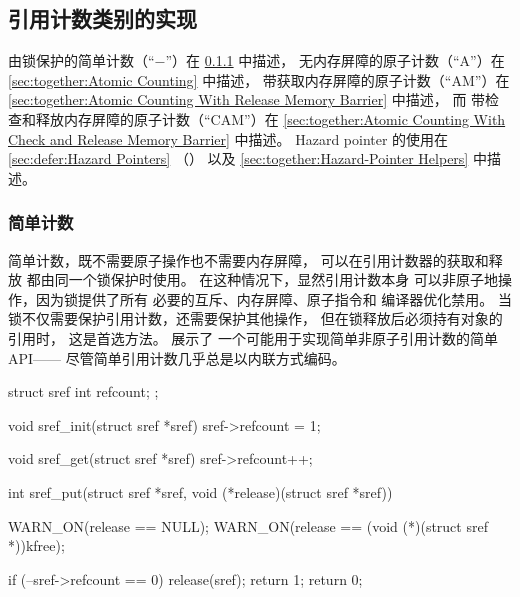 \subsection{引用计数类别的实现}
\label{sec:together:Implementation of Reference-Counting Categories}

由锁保护的简单计数（``$-$''）在
\cref{sec:together:Simple Counting} 中描述，
无内存屏障的原子计数（``A''）在
\cref{sec:together:Atomic Counting} 中描述，
带获取内存屏障的原子计数（``AM''）在
\cref{sec:together:Atomic Counting With Release Memory Barrier} 中描述，
而
带检查和释放内存屏障的原子计数（``CAM''）在
\cref{sec:together:Atomic Counting With Check and Release Memory Barrier} 中描述。
Hazard pointer 的使用在
\cref{sec:defer:Hazard Pointers}
（）
以及
\cref{sec:together:Hazard-Pointer Helpers} 中描述。

\subsubsection{简单计数}
\label{sec:together:Simple Counting}

简单计数，既不需要原子操作也不需要内存屏障，
可以在引用计数器的获取和释放
都由同一个锁保护时使用。
在这种情况下，显然引用计数本身
可以非原子地操作，因为锁提供了所有
必要的互斥、内存屏障、原子指令和
编译器优化禁用。
当锁不仅需要保护引用计数，还需要保护其他操作，
但在锁释放后必须持有对象的引用时，
这是首选方法。
 展示了
一个可能用于实现简单非原子引用计数的简单 API——
尽管简单引用计数几乎总是以内联方式编码。

\begin{listing}
\begin{fcvlabel}
\begin{VerbatimL}[commandchars=\\\[\]]
struct sref {
	int refcount;
};

void sref_init(struct sref *sref)
{
	sref->refcount = 1;
}

void sref_get(struct sref *sref)
{
	sref->refcount++;
}

int sref_put(struct sref *sref,
             void (*release)(struct sref *sref))
{
	WARN_ON(release == NULL);
	WARN_ON(release == (void (*)(struct sref *))kfree);

	if (--sref->refcount == 0) {
		release(sref);
		return 1;
	}
	return 0;
}
\end{VerbatimL}
\end{fcvlabel}
\caption{简单引用计数 API}
\label{lst:together:Simple Reference-Count API}
\end{listing}

